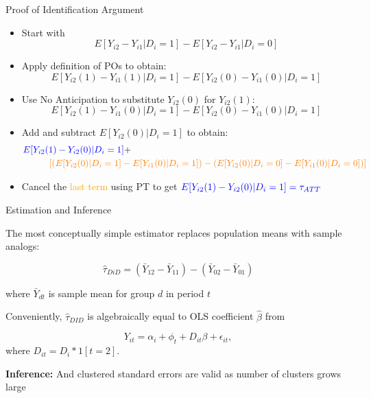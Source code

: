 \documentclass[usenames, dvipsnames, aspectratio = 169, 13pt]{beamer}
\newenvironment{wideitemize}{\itemize\addtolength{\itemsep}{10pt}}{\enditemize}
\begin{document}
\begin{frame}{Proof of Identification Argument}
\begin{itemize}
    \item
    Start with 
    $$E[Y_{i2}- Y_{i1}| D_i =1] - E[Y_{i2} - Y_{i1}| D_i =0]$$
    
    \pause
    \item 
    Apply definition of POs to obtain: 
    $$E[Y_{i2}(1) - Y_{i1}(1)| D_i =1] - E[Y_{i2}(0) - Y_{i1}(0)| D_i =1]$$
    
    \pause
    \item
    Use No Anticipation to substitute $Y_{i2}(0)$ for $Y_{i2}(1)$:
    $$E[Y_{i2}(1) - Y_{i1}(0)| D_i =1] - E[Y_{i2}(0) - Y_{i1}(0)| D_i =1]$$
    
    \pause
    \item
    Add and subtract $E[ Y_{i2}(0) | D_i =1] $ to obtain: 
    \begin{align*}
        &\textcolor{blue}{E[ Y_{i2}(1) - Y_{i2}(0) | D_i =1]} + \\
& \hspace{1cm} \textcolor{orange}{\left[ (E[Y_{i2}(0) | D_i = 1] - E[Y_{i1}(0)| D_i =1]) - (E[Y_{i2}(0) | D_i = 0] - E[Y_{i1}(0)| D_i =0]) \right]}
    \end{align*} 
    
    \pause
    \item
    Cancel the \textcolor{orange}{last term} using PT to get $\textcolor{blue}{E[Y_{i2}(1) - Y_{i2}(0) | D_i = 1] = \tau_{ATT}}$
\end{itemize}


\end{frame}

\begin{frame}{Estimation and Inference}
\begin{wideitemize}
    \item
    The most conceptually simple estimator replaces population means with sample analogs: 
    
    $$\hat{\tau}_{DiD} = (\bar{Y}_{12} - \bar{Y}_{11}) - (\bar{Y}_{02} - \bar{Y}_{01}) $$
    
    \noindent where $\bar{Y}_{dt}$ is sample mean for group $d$ in period $t$
    
    \pause
    \item
    Conveniently, $\hat\tau_{DID}$ is algebraically equal to OLS coefficient $\hat\beta$ from
    
\begin{equation}
    Y_{it} = \alpha_i + \phi_t + D_{it} \beta  + \epsilon_{it}, \label{eqn: TWFE-2-periods}
\end{equation}
    \noindent where $D_{it} = D_i * 1[t=2]$.
    \pause
    \item
    \textbf{Inference:} And clustered standard errors are valid as number of clusters grows large
\end{wideitemize}    
\end{frame}
\end{document}
